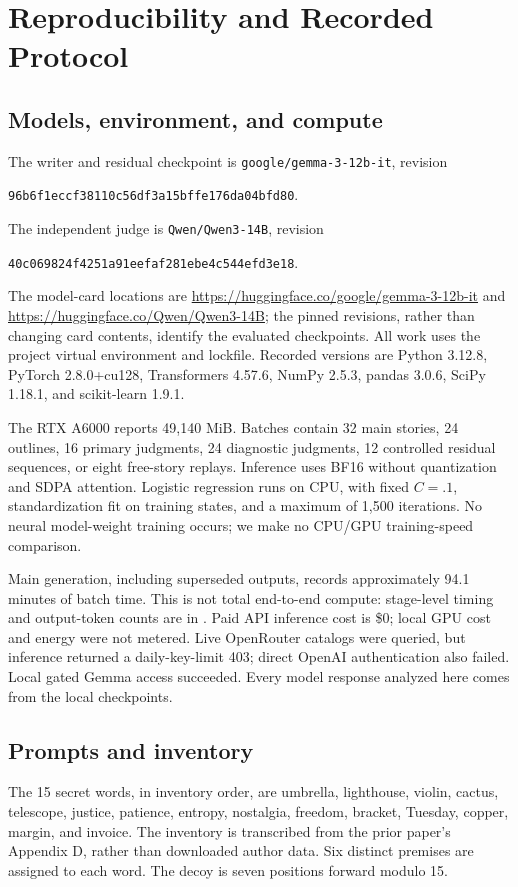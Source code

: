 \section{Reproducibility and Recorded Protocol}
\label{sec:reproduction}
\subsection{Models, environment, and compute}
The writer and residual checkpoint is \texttt{google/gemma-3-12b-it}, revision
\begin{center}\small\texttt{96b6f1eccf38110c56df3a15bffe176da04bfd80}.\end{center}
The independent judge is \texttt{Qwen/Qwen3-14B}, revision
\begin{center}\small\texttt{40c069824f4251a91eefaf281ebe4c544efd3e18}.\end{center}
The model-card locations are \url{https://huggingface.co/google/gemma-3-12b-it} and \url{https://huggingface.co/Qwen/Qwen3-14B}; the pinned revisions, rather than changing card contents, identify the evaluated checkpoints. All work uses the project virtual environment and lockfile. Recorded versions are Python 3.12.8, PyTorch 2.8.0+cu128, Transformers 4.57.6, NumPy 2.5.3, pandas 3.0.6, SciPy 1.18.1, and scikit-learn 1.9.1.

The RTX A6000 reports 49,140 MiB. Batches contain 32 main stories, 24 outlines, 16 primary judgments, 24 diagnostic judgments, 12 controlled residual sequences, or eight free-story replays. Inference uses BF16 without quantization and SDPA attention. Logistic regression runs on CPU, with fixed $C=.1$, standardization fit on training states, and a maximum of 1,500 iterations. No neural model-weight training occurs; we make no CPU/GPU training-speed comparison.

Main generation, including superseded outputs, records approximately 94.1 minutes of batch time. This is not total end-to-end compute: stage-level timing and output-token counts are in . Paid API inference cost is \$0; local GPU cost and energy were not metered. Live OpenRouter catalogs were queried, but inference returned a daily-key-limit 403; direct OpenAI authentication also failed. Local gated Gemma access succeeded. Every model response analyzed here comes from the local checkpoints.

\subsection{Prompts and inventory}
The 15 secret words, in inventory order, are umbrella, lighthouse, violin, cactus, telescope, justice, patience, entropy, nostalgia, freedom, bracket, Tuesday, copper, margin, and invoice. The inventory is transcribed from the prior paper's Appendix D, rather than downloaded author data. Six distinct premises are assigned to each word. The decoy is seven positions forward modulo 15.

